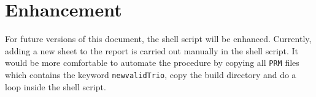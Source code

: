 \section{Enhancement}
For future versions of this document, the shell script will be enhanced.
Currently, adding a new sheet to the report is carried out manually
in the shell script. It would be more comfortable to automate the
procedure by copying all \texttt{PRM} files which contains the keyword
\texttt{newvalidTrio}, copy the build directory and do a loop inside
the shell script.
